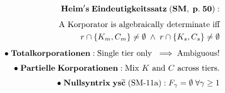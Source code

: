 \documentclass[preview]{standalone}
\begin{document}
\begin{align*}
\special{dvisvgm:raw <g id='unique000'>}\mathbf{Heim's\;Eindeutigkeitssatz\;(SM,\;p.\;50):}\\[4pt]\text{A Korporator is algebraically determinate iff}\\r \cap \{K_m, C_m\} \neq \emptyset \;\wedge\; r \cap \{K_s, C_s\} \neq \emptyset\\[5pt]\bullet\;\mathbf{Totalkorporationen:}\;\text{Single tier only }\implies\text{Ambiguous!}\\[3pt]\bullet\;\mathbf{Partielle\;Korporationen:}\;\text{Mix }K\text{ and }C\text{ across tiers.}\\[3pt]\bullet\;\mathbf{Nullsyntrix\;\mathbf{ys}\widetilde{\mathbf{c}}\;(\text{SM-11a}):}\;F_\gamma = \emptyset\;\forall\gamma\ge 1\special{dvisvgm:raw </g>}
\end{align*}
\end{document}
